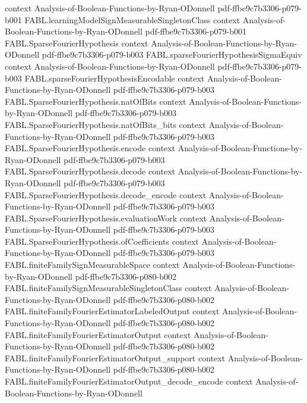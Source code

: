 \begin{theorem}
  {context}
  {Analysis-of-Boolean-Functions-by-Ryan-ODonnell}
  {pdf-ffbe9c7b3306-p079-b001}
\proofstep
  {FABL.learningModelSignMeasurableSingletonClass}
  {context}
  {Analysis-of-Boolean-Functions-by-Ryan-ODonnell}
  {pdf-ffbe9c7b3306-p079-b001}
\proofstep
  {FABL.SparseFourierHypothesis}
  {context}
  {Analysis-of-Boolean-Functions-by-Ryan-ODonnell}
  {pdf-ffbe9c7b3306-p079-b003}
\proofstep
  {FABL.sparseFourierHypothesisSigmaEquiv}
  {context}
  {Analysis-of-Boolean-Functions-by-Ryan-ODonnell}
  {pdf-ffbe9c7b3306-p079-b003}
\proofstep
  {FABL.sparseFourierHypothesisEncodable}
  {context}
  {Analysis-of-Boolean-Functions-by-Ryan-ODonnell}
  {pdf-ffbe9c7b3306-p079-b003}
\proofstep
  {FABL.SparseFourierHypothesis.natOfBits}
  {context}
  {Analysis-of-Boolean-Functions-by-Ryan-ODonnell}
  {pdf-ffbe9c7b3306-p079-b003}
\proofstep
  {FABL.SparseFourierHypothesis.natOfBits_bits}
  {context}
  {Analysis-of-Boolean-Functions-by-Ryan-ODonnell}
  {pdf-ffbe9c7b3306-p079-b003}
\proofstep
  {FABL.SparseFourierHypothesis.encode}
  {context}
  {Analysis-of-Boolean-Functions-by-Ryan-ODonnell}
  {pdf-ffbe9c7b3306-p079-b003}
\proofstep
  {FABL.SparseFourierHypothesis.decode}
  {context}
  {Analysis-of-Boolean-Functions-by-Ryan-ODonnell}
  {pdf-ffbe9c7b3306-p079-b003}
\proofstep
  {FABL.SparseFourierHypothesis.decode_encode}
  {context}
  {Analysis-of-Boolean-Functions-by-Ryan-ODonnell}
  {pdf-ffbe9c7b3306-p079-b003}
\proofstep
  {FABL.SparseFourierHypothesis.evaluationWork}
  {context}
  {Analysis-of-Boolean-Functions-by-Ryan-ODonnell}
  {pdf-ffbe9c7b3306-p079-b003}
\proofstep
  {FABL.SparseFourierHypothesis.ofCoefficients}
  {context}
  {Analysis-of-Boolean-Functions-by-Ryan-ODonnell}
  {pdf-ffbe9c7b3306-p079-b003}
\proofstep
  {FABL.finiteFamilySignMeasurableSpace}
  {context}
  {Analysis-of-Boolean-Functions-by-Ryan-ODonnell}
  {pdf-ffbe9c7b3306-p080-b002}
\proofstep
  {FABL.finiteFamilySignMeasurableSingletonClass}
  {context}
  {Analysis-of-Boolean-Functions-by-Ryan-ODonnell}
  {pdf-ffbe9c7b3306-p080-b002}
\proofstep
  {FABL.finiteFamilyFourierEstimatorLabeledOutput}
  {context}
  {Analysis-of-Boolean-Functions-by-Ryan-ODonnell}
  {pdf-ffbe9c7b3306-p080-b002}
\proofstep
  {FABL.finiteFamilyFourierEstimatorOutput}
  {context}
  {Analysis-of-Boolean-Functions-by-Ryan-ODonnell}
  {pdf-ffbe9c7b3306-p080-b002}
\proofstep
  {FABL.finiteFamilyFourierEstimatorOutput_support}
  {context}
  {Analysis-of-Boolean-Functions-by-Ryan-ODonnell}
  {pdf-ffbe9c7b3306-p080-b002}
\proofstep
  {FABL.finiteFamilyFourierEstimatorOutput_decode_encode}
  {context}
  {Analysis-of-Boolean-Functions-by-Ryan-ODonnell}

\end{theorem}
